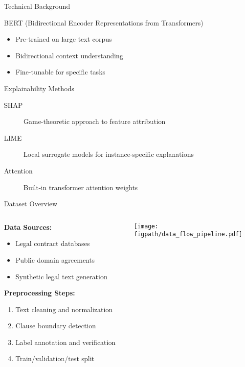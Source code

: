 \begin{frame}{Technical Background}
\begin{block}{BERT (Bidirectional Encoder Representations from Transformers)}
\begin{itemize}
    \item Pre-trained on large text corpus
    \item Bidirectional context understanding
    \item Fine-tunable for specific tasks
\end{itemize}
\end{block}

\begin{block}{Explainability Methods}
\begin{description}
    \item[SHAP] Game-theoretic approach to feature attribution
    \item[LIME] Local surrogate models for instance-specific explanations
    \item[Attention] Built-in transformer attention weights
\end{description}
\end{block}
\end{frame}

\begin{frame}{Dataset Overview}
\begin{columns}
\begin{column}{0.6\textwidth}
\textbf{Data Sources:}
\begin{itemize}
    \item Legal contract databases
    \item Public domain agreements
    \item Synthetic legal text generation
\end{itemize}

\vspace{0.5cm}
\textbf{Preprocessing Steps:}
\begin{enumerate}
    \item Text cleaning and normalization
    \item Clause boundary detection
    \item Label annotation and verification
    \item Train/validation/test split
\end{enumerate}
\end{column}
\begin{column}{0.4\textwidth}
\begin{center}
\texttt{[image: \\figpath/data\_flow\_pipeline.pdf]}
\end{center}
\end{column}
\end{columns}
\end{frame}
